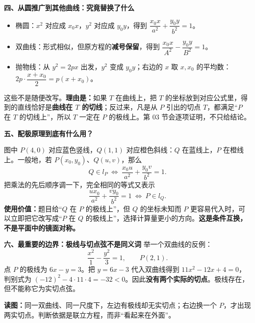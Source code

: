 \begin{explanationbox}
\medskip
\textbf{\textcolor{CExplanation}{四、从圆推广到其他曲线：究竟替换了什么}}
\begin{itemize}[leftmargin=*,itemsep=0.4em]
\item 椭圆：$x^2$ 对应成 $x_0x$，$y^2$ 对应成 $y_0y$，得到 $\dfrac{x_0x}{a^2}+\dfrac{y_0y}{b^2}=1$。
\item 双曲线：形式相似，但原方程的\textbf{减号保留}，得到 $\dfrac{x_0x}{A^2}-\dfrac{y_0y}{B^2}=1$。
\item 抛物线：从 $y^2=2px$ 出发，$y^2$ 变成 $y_0y$；右边的 $x$ 取 $x,x_0$ 的平均数：$2p\cdot\dfrac{x+x_0}{2}=p(x+x_0)$。
\end{itemize}
这些不是随便改写。\textbf{理由是：}如果 $T$ 在曲线上，把 $T$ 的坐标放到对应公式里，得到的直线恰好是\textbf{曲线在 $T$ 的切线}；反过来，凡是从 $P$ 引出的切点 $T$，都满足“$P$ 在 $T$ 的切线上”，所以 $T$ 一定在 $P$ 的极线上。第 03 节会逐项证明，不只给结论。

\medskip
\textbf{\textcolor{CExplanation}{五、配极原理到底有什么用？}}

\begin{center}\end{center}
图中 $P(4,0)$ 对应蓝色竖线，$Q(1,1)$ 对应橙色斜线：$Q$ 在蓝线上，$P$ 在橙线上。一般地，若 $P(x_0,y_0)$、$Q(u,v)$，那么
\[
Q\in l_P\ \Longleftrightarrow\ \frac{x_0u}{a^2}+\frac{y_0v}{b^2}=1.
\]
把乘法的先后顺序调一下，完全相同的等式又表示
\[
\frac{ux_0}{a^2}+\frac{vy_0}{b^2}=1\ \Longleftrightarrow\ P\in l_Q.
\]
\textbf{使用价值：}题目给“$Q$ 在 $P$ 的极线上”，但 $Q$ 的坐标未知而 $P$ 更容易代入时，可以立即把它改写成“$P$ 在 $Q$ 的极线上”，选择计算量更小的方向。\textbf{这是条件互换，不是平面中的镜面对称。}

\medskip
\textbf{\textcolor{CExplanation}{六、最重要的边界：极线与切点弦不是同义词}}
举一个双曲线的反例：
\[
\frac{x^2}{1}-\frac{y^2}{3}=1,\qquad P(2,1).
\]
点 $P$ 的极线为 $6x-y=3$。把 $y=6x-3$ 代入双曲线得到 $11x^2-12x+4=0$，判别式为 $(-12)^2-4\cdot11\cdot4=-32<0$。因此\textbf{没有两个实际的切点}。极线存在，但不能称它为实切点弦。


\begin{center}\end{center}
\noindent\textbf{读图：}同一双曲线、同一尺度下，左边有极线却无实切点；右边换一个 $P$，才出现两实切点。判断依据是联立方程，而非“看起来在外面”。
\end{explanationbox}
